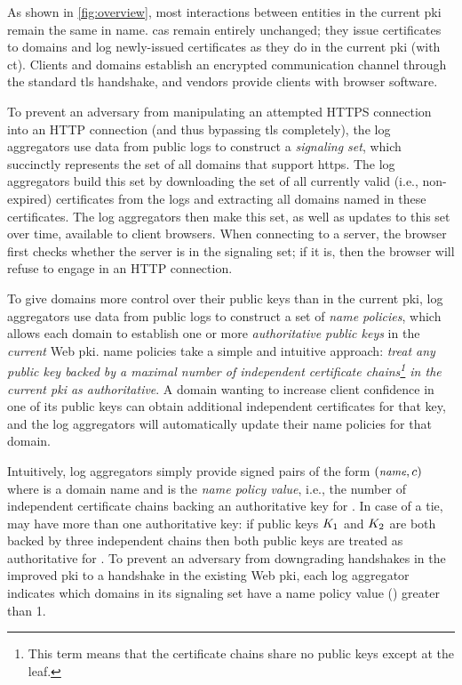 As shown in \autoref{fig:overview}, most interactions between entities in
the current \ac{pki} remain the same in \ac{name}. \acp{ca} remain entirely unchanged;
they issue certificates
to domains and log newly-issued certificates as they do in the current \ac{pki}
(with \ac{ct}). Clients and domains establish an encrypted communication channel
through the standard \ac{tls} handshake, and vendors provide clients with browser
software.

To prevent an adversary from manipulating an attempted HTTPS connection into
an HTTP connection (and thus bypassing \ac{tls}
completely), the log aggregators use data from public logs to construct a
\emph{signaling set}, which succinctly represents the set of all domains that
support \ac{https}. The log aggregators build this set by downloading the set of
all currently valid (i.e., non-expired) certificates from the logs and
extracting all domains named in these certificates. The log aggregators then
make this set, as well as updates to this set over time, available to client
browsers.  When connecting to a server, the browser first checks whether
the server is in the signaling set; if it is, then the browser will refuse
to engage in an HTTP connection.

To give domains more control over their public keys than in the current
\ac{pki}, log aggregators use data from public logs to construct a set of
\emph{\ac{name} policies}, which allows each domain to establish one or more
\emph{authoritative public keys} in the \emph{current} Web \ac{pki}. \ac{name}
policies take a simple and intuitive approach: \emph{treat any public key backed
  by a maximal number of independent certificate chains\footnote{This term means
  that the certificate chains share no public keys except at the leaf.} in the
current \ac{pki} as authoritative}. A domain wanting to increase client
confidence in one of its public keys can obtain additional independent
certificates for that key, and the log aggregators will automatically update
their \ac{name} policies for that domain.

Intuitively, log aggregators simply provide signed pairs of the form
$(\small{\emph{name}}, c)$ where \hostname is a domain name and \policy is the
\emph{\ac{name} policy value}, i.e., the number of independent certificate
chains backing an authoritative key for \hostname. In case of a tie, \hostname
may have more than one authoritative key: if public keys $K_1$ and $K_2$ are
both backed by three independent chains then both public keys are treated as
authoritative for \hostname. To prevent an adversary from downgrading handshakes
in the improved \ac{pki} to a handshake in the existing Web \ac{pki}, each log
aggregator indicates which domains in its signaling set have a \ac{name} policy
value (\policy) greater than 1.

